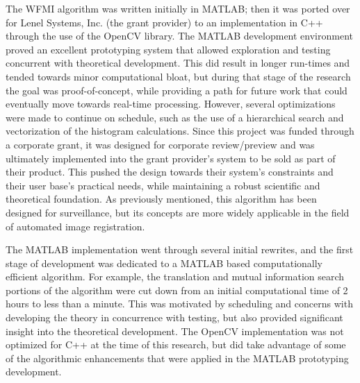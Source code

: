 %
%
%
%
%
%
%
%
%

%
%
%



The WFMI algorithm was written initially in MATLAB\textsuperscript{\textregistered}; then it was ported over for Lenel Systems, Inc. (the grant provider) to an implementation in C++ through the use of the OpenCV library. The MATLAB\textsuperscript{\textregistered} development environment proved an excellent prototyping system that allowed exploration and testing concurrent with theoretical development. This did result in longer run-times and tended towards minor computational bloat, but during that stage of the research the goal was proof-of-concept, while providing a path for future work that could eventually move towards real-time processing. However, several optimizations were made to continue on schedule, such as the use of a hierarchical search and vectorization of the histogram calculations. Since this project was funded through a corporate grant, it was designed for corporate review/preview and was ultimately implemented into the grant provider's system to be sold as part of their product. This pushed the design towards their system's constraints and their user base's practical needs, while maintaining a robust scientific and theoretical foundation. As previously mentioned, this algorithm has been designed for surveillance, but its concepts are more widely applicable in the field of automated image registration.

The MATLAB\textsuperscript{\textregistered} implementation went through several initial rewrites, and the first stage of development was dedicated to a MATLAB\textsuperscript{\textregistered} based computationally efficient algorithm. For example, the translation and mutual information search portions of the algorithm were cut down from an initial computational time of 2 hours to less than a minute. This was motivated by scheduling and concerns with developing the theory in concurrence with testing, but also provided significant insight into the theoretical development. The OpenCV implementation was not optimized for C++ at the time of this research, but did take advantage of some of the algorithmic enhancements that were applied in the MATLAB\textsuperscript{\textregistered} prototyping development.

